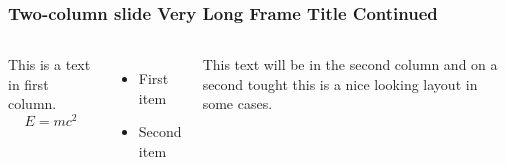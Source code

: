 \documentclass[aspectratio=1610]{beamer}
\begin{document}
\begin{frame}
\frametitle{Two-column slide Very Long Frame Title Continued}
\begin{columns}

This is a text in first column.
$$E=mc^2$$
\begin{itemize}
\item First item
\item Second item
\end{itemize}

This text will be in the second column
and on a second tought this is a nice looking
layout in some cases.
\end{columns}
\end{frame}
\end{document}
